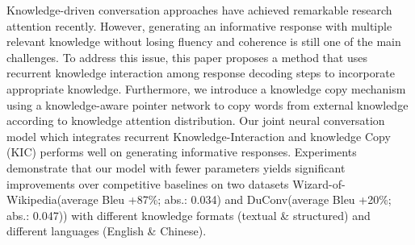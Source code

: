 Knowledge-driven conversation approaches have achieved remarkable research attention recently. However, generating an informative response with multiple relevant knowledge without losing fluency and coherence is still one of the main challenges. To address this issue, this paper proposes a method that uses recurrent knowledge interaction among response decoding steps to incorporate appropriate knowledge. Furthermore, we introduce a knowledge copy mechanism using a knowledge-aware pointer network to copy words from external knowledge according to knowledge attention distribution. Our joint neural conversation model which integrates recurrent Knowledge-Interaction and knowledge Copy (KIC) performs well on generating informative responses. Experiments demonstrate that our model with fewer parameters yields significant improvements over competitive baselines on two datasets Wizard-of-Wikipedia(average Bleu +87\%; abs.: 0.034) and DuConv(average Bleu +20\%; abs.: 0.047)) with different knowledge formats (textual \& structured) and different languages (English \& Chinese).
